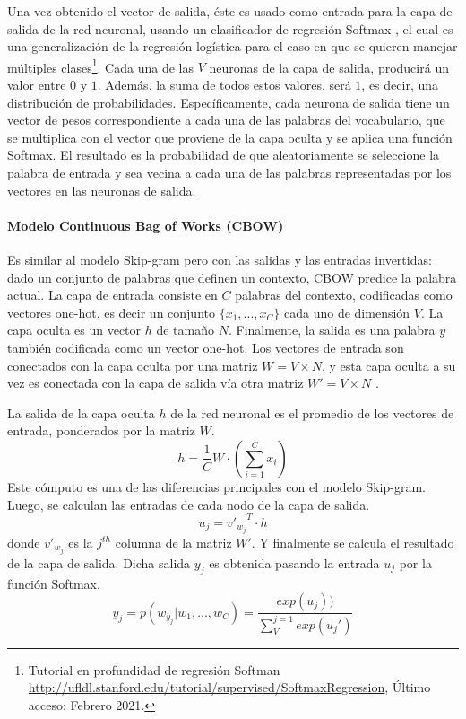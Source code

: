 \bigskip Una vez obtenido el vector de salida, éste es usado como entrada para la capa de salida de la red neuronal, usando un clasificador de regresión Softmax \citep{morin2005hierarchical}, el cual es una generalización de la regresión logística para el caso en que se quieren manejar múltiples clases\footnote{Tutorial en profundidad de regresión Softman \url{http://ufldl.stanford.edu/tutorial/supervised/SoftmaxRegression},  Último acceso: Febrero 2021.}. Cada una de las \(V\) neuronas de la capa de salida, producirá un valor entre \(0\) y \(1\). Además, la suma de todos estos valores, será \(1\), es decir, una distribución de probabilidades. Específicamente, cada neurona de salida tiene un vector de pesos correspondiente a cada una de las palabras del vocabulario, que se multiplica con el vector que proviene de la capa oculta y se aplica una función Softmax. El resultado es la probabilidad de que aleatoriamente se seleccione la palabra de entrada y sea vecina a cada una de las palabras representadas por los vectores en las neuronas de salida.

\paragraph{Modelo Continuous Bag of Works (CBOW)}
Es similar al modelo Skip-gram pero con las salidas y las entradas invertidas: dado un conjunto de palabras que definen un contexto, CBOW predice la palabra actual. La capa de entrada consiste en \(C\) palabras del contexto, codificadas como vectores one-hot, es decir un conjunto \( \{x_1,..., x_C\}\) cada uno de dimensión \(V\). La capa oculta es un vector \(h\) de tamaño \(N\). Finalmente, la salida es una palabra \(y\) también codificada como un vector one-hot. Los vectores de entrada son conectados con la capa oculta por una matriz \(W=V \times N\), y esta capa oculta a su vez es conectada con la capa de salida vía otra matriz \(W'=V \times N\) \citep{cbowmodel}.

\bigskip La salida de la capa oculta \(h\) de la red neuronal es el promedio de los vectores de entrada, ponderados por la matriz \(W\).
\[h = \frac{1}{C}W \cdot (\sum_{i=1}^{C}{x_i})\]
Este cómputo es una de las diferencias principales con el modelo Skip-gram. Luego, se calculan las entradas de cada nodo de la capa de salida.
\[u_j = {v'_{w_j}}^{T} \cdot h\]
donde \(v'_{w_j}\) es la \(j^{th}\) columna de la matriz \(W'\). Y finalmente se calcula el resultado de la capa de salida. Dicha salida \(y_j\) es obtenida pasando la entrada \(u_j\) por la función Softmax.
\[y_j=p(w_{y_j}|w_1,...,w_C)=\frac{exp(u_j))}{\sum_{V}^{j=1}exp(u_j')}\]

